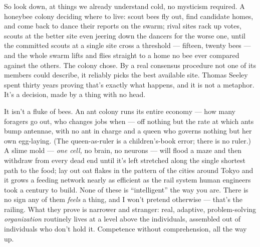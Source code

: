\documentclass[11pt,openany]{book}
\begin{document}
So look down, at things we already understand cold, no mysticism required. A honeybee colony deciding where to live: scout bees fly out, find candidate homes, and come back to dance their reports on the swarm; rival sites rack up votes, scouts at the better site even jeering down the dancers for the worse one, until the committed scouts at a single site cross a threshold — fifteen, twenty bees — and the whole swarm lifts and flies straight to a home no bee ever compared against the others. The colony chose. By a real consensus procedure not one of its members could describe, it reliably picks the best available site. Thomas Seeley spent thirty years proving that’s exactly what happens, and it is not a metaphor. It’s a decision, made by a thing with no head.

It isn’t a fluke of bees. An ant colony runs its entire economy — how many foragers go out, who changes jobs when — off nothing but the rate at which ants bump antennae, with no ant in charge and a queen who governs nothing but her own egg-laying. (The queen-as-ruler is a children’s-book error; there is no ruler.) A slime mold — \textit{one cell,} no brain, no neurons — will flood a maze and then withdraw from every dead end until it’s left stretched along the single shortest path to the food; lay out oat flakes in the pattern of the cities around Tokyo and it grows a feeding network nearly as efficient as the rail system human engineers took a century to build. None of these is “intelligent” the way you are. There is no sign any of them \textit{feels} a thing, and I won’t pretend otherwise — that’s the railing. What they prove is narrower and stranger: real, adaptive, problem-solving \textit{organization} routinely lives at a level above the individuals, assembled out of individuals who don’t hold it. Competence without comprehension, all the way up.
\end{document}
